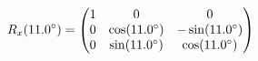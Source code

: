 \documentclass[preview]{standalone}
\begin{document}
\begin{align*}
\special{dvisvgm:raw <g id='unique000'>}R_x(11.0^\circ) = \begin{pmatrix} 1 & 0 & 0 \\ 0 & \cos(11.0^\circ) & -\sin(11.0^\circ) \\ 0 & \sin(11.0^\circ) & \cos(11.0^\circ) \end{pmatrix}\special{dvisvgm:raw </g>}
\end{align*}
\end{document}
